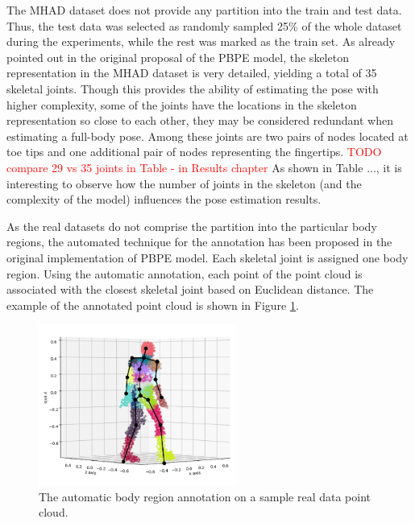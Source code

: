 \vspace{5mm}
\noindent
The MHAD dataset does not provide any partition into the train and test data. Thus, the test data was selected as randomly sampled 25\% of the whole dataset during the experiments, while the rest was marked as the train set. %
As already pointed out in the original proposal of the PBPE model, the skeleton representation in the MHAD dataset is very detailed, yielding a total of 35 skeletal joints. Though this provides the ability of estimating the pose with higher complexity, some of the joints have the locations in the skeleton representation so close to each other, they may be considered redundant when estimating a full-body pose. Among these joints are two pairs of nodes located at toe tips and one additional pair of nodes representing the fingertips.
\textcolor{red}{TODO compare 29 vs 35 joints in Table - in Results chapter} As shown in Table ..., it is interesting to observe how the number of joints in the skeleton (and the complexity of the model) influences the pose estimation results.\par
\vspace{5mm}
\noindent 
As the real datasets do not comprise the partition into the particular body regions, the automated technique for the annotation has been proposed in the original implementation of PBPE model. Each skeletal joint is assigned one body region. Using the automatic annotation, each point of the point cloud is associated with the closest skeletal joint based on Euclidean distance. The example of the annotated point cloud is shown in Figure \ref{fig:reg_annotation}.\par 

\vspace{5mm}
\begin{figure}[H]
\begin{center}
  \includegraphics[height=200px]{images/implementation/region_annotation.png}
  \caption[The automatic body region annotation on real data.]{The automatic body region annotation on a sample real data point cloud.}
  \label{fig:reg_annotation}
\end{center}
\end{figure}

